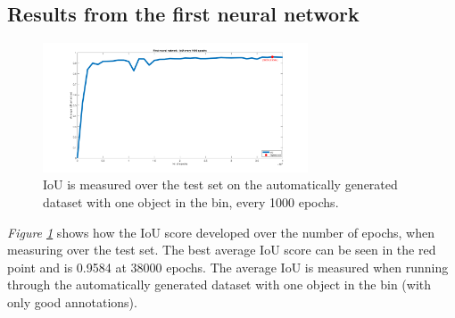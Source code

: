 \subsection{Results from the first neural network} \label{sec:firstneural}
\begin{figure}[h]
 \centering
 \includegraphics[width=0.7\textwidth, trim={5cm 0 4cm 0},clip]{graphics/results/neuralnetworkauto.png}
 \caption{IoU is measured over the test set on the automatically generated dataset with one object in the bin, every 1000 epochs.}
 \label{fig:neuralnetwork}
\end{figure}
\textit{Figure \ref{fig:neuralnetwork}} shows how the IoU score developed over the number of epochs, when measuring over the test set. The best average IoU score can be seen in the red point and is 0.9584 at 38000 epochs. The average IoU is measured when running through the automatically generated dataset with one object in the bin (with only good annotations).

